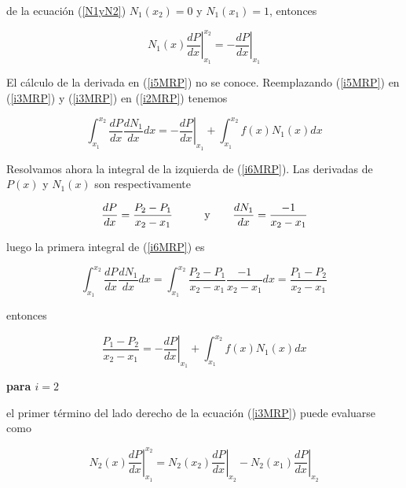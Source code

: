 \documentclass[10pt,a4paper]{article}
\begin{document}
\noindent de la ecuaci\'on (\ref{N1yN2}) $N_1(x_2)=0$ y $N_1(x_1)=1$, entonces

\begin{equation}\label{i5MRP}
 N_1(x) \left .\frac{dP}{dx} \right |_{x_1}^{x_2}= -\left .\frac{dP}{dx}\right |_{x_1}
\end{equation}

El c\'alculo de la derivada en (\ref{i5MRP}) no se conoce. Reemplazando (\ref{i5MRP}) en (\ref{i3MRP}) y (\ref{i3MRP}) en (\ref{i2MRP}) tenemos

\begin{equation}\label{i6MRP}
 \int_{x_1}^{x_2} \frac{dP}{dx}\frac{dN_1}{dx}dx=-\left .\frac{dP}{dx}\right |_{x_1}+\int_{x_1}^{x_2}f(x)N_1(x)dx 
\end{equation}

Resolvamos ahora la integral de la izquierda de (\ref{i6MRP}). Las derivadas de $P(x)$ y $N_1(x)$ son respectivamente

\begin{equation}\label{dTdx}
  \displaystyle \frac{dP}{dx}=\frac{P_2-P_1}{x_2-x_1} \hspace*{0.9cm} \mbox { y } \hspace*{0.6cm} \frac{dN_1}{dx}=\frac{-1}{x_2-x_1} 
\end{equation}

\noindent luego la primera integral de (\ref{i6MRP}) es

\begin{equation}\label{i7MRP}
 \int_{x_1}^{x_2} \frac{dP}{dx}\frac{dN_1}{dx}dx=\int_{x_1}^{x_2}\frac{P_2-P_1}{x_2-x_1}\frac{-1}{x_2-x_1}dx=\frac{P_1-P_2}{x_2-x_1}
\end{equation}

\noindent entonces

\begin{equation}\label{i1}
 \frac{P_1-P_2}{x_2-x_1}=-\left .\frac{dP}{dx}\right |_{x_1}+\int_{x_1}^{x_2}f(x)N_1(x)dx
\end{equation}

  \bigskip

{\bf para $i=2$}

  \bigskip

\noindent el primer t\'ermino del lado derecho de la ecuaci\'on (\ref{i3MRP}) puede evaluarse como

\begin{equation}\label{i8MRP}
 N_2(x) \left .\frac{dP}{dx} \right |_{x_1}^{x_2}= N_2(x_2)\left .\frac{dP}{dx}\right |_{x_2}-N_2(x_1)\left .\frac{dP}{dx}\right |_{x_2}
\end{equation}
\end{document}
